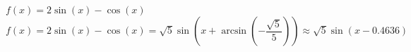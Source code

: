  {$f(x) = 2\sin(x) - \cos(x)$}
{ $f(x) = 2\sin(x) - \cos(x) = \sqrt{5}\sin\left(x  + \arcsin\left(-\dfrac{\sqrt{5}}{5}\right)\right) \approx \sqrt{5}\sin(x -0.4636)$}
